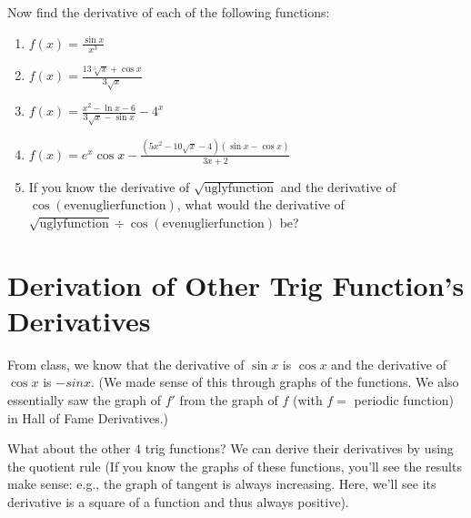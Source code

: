 \documentclass{ximera}
\begin{document}
\begin{question}
Now find the derivative of each of the following functions:
\begin{enumerate}
    \item $f(x) = \frac{\sin x }{x^3}$
    \item $f(x) = \frac{13\sqrt[5]{x} + \cos x}{3\sqrt{x}}$
    \item $f(x) = \frac{x^2-\ln x - 6}{3\sqrt{x} - \sin x} - 4^x$
    \item $f(x) = e^x \cos x - \frac{(5x^2-10\sqrt{x}-4)(\sin x - \cos x)}{3x+2}$
    \item If you know the derivative of $\sqrt{\text{uglyfunction}}$ and the derivative of  $\cos(\text{evenuglierfunction})$, what would the derivative of  $\sqrt{\text{uglyfunction}} \div \cos(\text{evenuglierfunction})$  be?
\end{enumerate}
\end{question}



\section*{Derivation of Other Trig Function's Derivatives}

From class, we know that the derivative of $\sin x$ is $\cos x$ and the derivative of $\cos x$ is 
$-sin x$.  (We made sense of this through graphs of the functions.  We also essentially saw the graph of $f'$  from the graph of $f$ (with $f =$ periodic function) in Hall of Fame Derivatives.)

What about the other $4$ trig functions?  We can derive their derivatives by using the quotient rule (If you know the graphs of these functions, you'll see the results make sense: e.g., the graph of tangent is always increasing.  Here, we'll see its derivative is a square of a function and thus always positive).  
\end{document}
